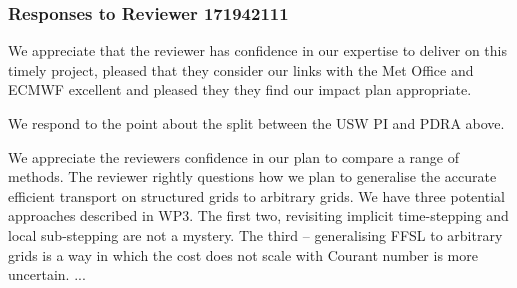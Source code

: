\subsubsection*{Responses to Reviewer 171942111}

We appreciate that the reviewer has confidence in our expertise to deliver on this timely project, pleased that they consider our links with the Met Office and ECMWF excellent and pleased they they find our impact plan appropriate.

We respond to the point about the split between the USW PI and PDRA above.

We appreciate the reviewers confidence in our plan to compare a range of methods. The reviewer rightly questions how we plan to generalise the accurate efficient transport on structured grids to arbitrary grids. We have three potential approaches described in WP3. The first two, revisiting implicit time-stepping and local sub-stepping are not a mystery. The third -- generalising FFSL to arbitrary grids is a way in which the cost does not scale with Courant number is more uncertain. ...

\renewcommand{\refname}{References}




